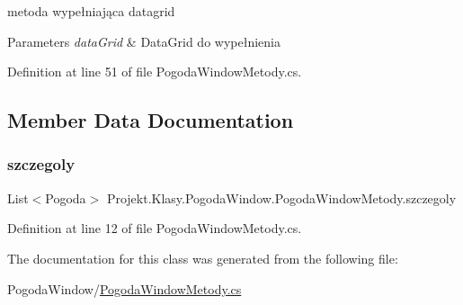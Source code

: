metoda wypełniająca datagrid 


\begin{DoxyParams}{Parameters}
{\em data\+Grid} & Data\+Grid do wypełnienia\\
\hline
\end{DoxyParams}


Definition at line 51 of file Pogoda\+Window\+Metody.\+cs.



\subsection{Member Data Documentation}
\mbox{\label{class_projekt_1_1_klasy_1_1_pogoda_window_1_1_pogoda_window_metody_a83c3d93d6f5240995a53ed912484d500}} 
\subsubsection{\texorpdfstring{szczegoly}{szczegoly}}
{\footnotesize\ttfamily List$<$Pogoda$>$ Projekt.\+Klasy.\+Pogoda\+Window.\+Pogoda\+Window\+Metody.\+szczegoly}



Definition at line 12 of file Pogoda\+Window\+Metody.\+cs.



The documentation for this class was generated from the following file\+:\begin{DoxyCompactItemize}
\item 
Pogoda\+Window/\mbox{\hyperlink{_pogoda_window_metody_8cs}{Pogoda\+Window\+Metody.\+cs}}\end{DoxyCompactItemize}
